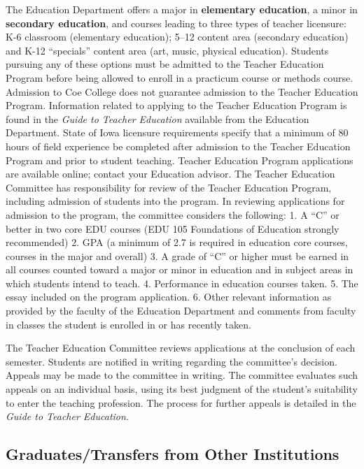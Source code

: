 \documentclass[
  letterpaper,
]{scrbook}
\begin{document}
The Education Department offers a major in \textbf{elementary
education}, a minor in \textbf{secondary education}, and courses leading
to three types of teacher licensure: K-6 classroom (elementary
education); 5--12 content area (secondary education) and K-12
``specials'' content area (art, music, physical education). Students
pursuing any of these options must be admitted to the Teacher Education
Program before being allowed to enroll in a practicum course or methods
course. Admission to Coe College does not guarantee admission to the
Teacher Education Program. Information related to applying to the
Teacher Education Program is found in the \emph{Guide to Teacher
Education} available from the Education Department. State of Iowa
licensure requirements specify that a minimum of 80 hours of field
experience be completed after admission to the Teacher Education Program
and prior to student teaching. Teacher Education Program applications
are available online; contact your Education advisor. The Teacher
Education Committee has responsibility for review of the Teacher
Education Program, including admission of students into the program. In
reviewing applications for admission to the program, the committee
considers the following: 1. A ``C'' or better in two core EDU courses
(EDU 105 Foundations of Education strongly recommended) 2. GPA (a
minimum of 2.7 is required in education core courses, courses in the
major and overall) 3. A grade of ``C'' or higher must be earned in all
courses counted toward a major or minor in education and in subject
areas in which students intend to teach. 4. Performance in education
courses taken. 5. The essay included on the program application. 6.
Other relevant information as provided by the faculty of the Education
Department and comments from faculty in classes the student is enrolled
in or has recently taken.

The Teacher Education Committee reviews applications at the conclusion
of each semester. Students are notified in writing regarding the
committee's decision. Appeals may be made to the committee in writing.
The committee evaluates such appeals on an individual basis, using its
best judgment of the student's suitability to enter the teaching
profession. The process for further appeals is detailed in the
\emph{Guide to Teacher Education}.

\subsection{Graduates/Transfers from Other
Institutions}\label{graduatestransfers-from-other-institutions}
\end{document}

